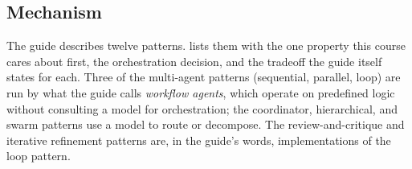 \subsection{Mechanism}

The guide describes twelve patterns.  lists them with the one
property this course cares about first, the orchestration decision, and the tradeoff the
guide itself states for each. Three of the multi-agent patterns (sequential, parallel,
loop) are run by what the guide calls \emph{workflow agents}, which operate on predefined
logic without consulting a model for orchestration; the coordinator, hierarchical, and
swarm patterns use a model to route or decompose. The review-and-critique and iterative
refinement patterns are, in the guide's words, implementations of the loop pattern.

